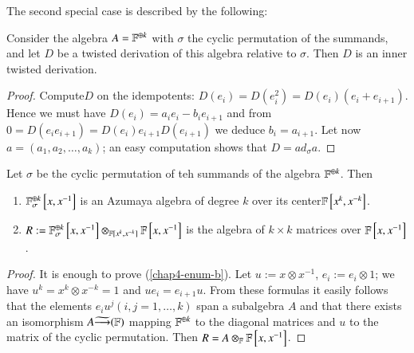 The second special case is described by the following:

\begin{lemma*}
Consider the algebra $A=\mathbb{F}^{\oplus k}$ with $\sigma$ the cyclic permutation of the summands, and let $D$ be a twisted derivation of this algebra relative to $\sigma$. Then $D$ is an inner twisted derivation.
\end{lemma*}

\begin{proof}
Compute\pageoriginale $D$ on the idempotents: $D(e_{i}) = D(e_{i}^{2}) =D(e_{i})(e_{i}+e_{i+1})$. Hence we must have $D(e_{i})=a_{i}e_{i}-b_{i}e_{i+1}$ and from $0=D(e_{i}e_{i+1}) = D(e_{i})e_{i+1}D(e_{i+1})$ we deduce $b_{i} =a_{i+1}$. Let now $a = (a_{1},a_{2}, \ldots, a_{k})$; an easy computation shows that $D= ad_{\sigma}a$. 
\end{proof}

\begin{prop*}
Let $\sigma$ be the cyclic permutation of teh summands of the algebra $\mathbb{F}^{\oplus k}$. Then
\begin{enumerate}[{\it (a)}]
\item $\mathbb{F}_{\sigma}^{\oplus k}\left[x, x^{-1}\right]$ is an Azumaya algebra of degree $k$ over its center\break $\mathbb{F}\left[x^{k}, x^{-k}\right]$.\label{chap4-enum-a}
\item $R:=\mathbb{F}_{\sigma}^{\oplus k}\left[x, x^{-1}\right]\otimes_{\mathbb{F}[x^{k}, x^{-k}]}\mathbb{F}\left[x, x^{-1}\right]$ is the algebra of $k\times k $ matrices over $\mathbb{F}\left[x, x^{-1}\right]$.\label{chap4-enum-b}
\end{enumerate}
\end{prop*}

\begin{proof}
It is enough to prove (\ref{chap4-enum-b}). Let $u:=x\otimes x^{-1}$, $e_{i}:=e_{i}\otimes 1$; we have $u^{k} = x^{k}\otimes x^{-k} = 1$ and $ue_{i}=e_{i+1}u$. From these formulas it easily follows that the elements
$e_{i}u^{j}(i,j =1,\ldots, k)$ span a subalgebra $A$ and that there exists an isomorphism $A\widetilde{\longrightarrow}(\mathbb{F})$ mapping $\mathbb{F}^{\oplus k}$ to the diagonal matrices and $u$ to the matrix of the cyclic permutation. Then $R=A\otimes_{\mathbb{F}}\mathbb{F}\left[x, x^{-1}\right]$. 
\end{proof}


\subsection{}\label{chap4-subsec-1.4}

